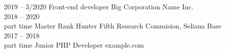 

\begin{entrylist}
	\entry%
		{2019 -- 3/2020}
		{Front-end developer}
		{Big Corporation Name Inc.}
        {\lorem\lorem\lorem\\%
        \tagsep{}\tagsep{}}
	\entry%
		{2018 -- 2020\\\footnotesize{part time}}
		{Master Rank Hunter}
		{Fifth Research Commision, Seliana Base}
		{\lorem\lorem\\%
            \tagsep{}\tagsep%
            \tagsep{}}
	\entry%
		{2017 -- 2018\\\footnotesize{part time}}
		{Junior PHP Developer}
		{example.com}
		{\lorem\lorem\\%
            \tagsep{}}
\end{entrylist}



